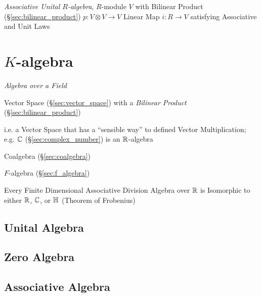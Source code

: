 \emph{Associative Unital $R$-algebra}, $R$-module $V$ with Bilinear
Product (\S\ref{sec:bilinear_product}) $p : V \otimes V \rightarrow V$
Linear Map $i : R \rightarrow V$ satisfying Associative and Unit Laws



\section{$K$-algebra}\label{sec:k_algebra}

\emph{Algebra over a Field}

Vector Space (\S\ref{sec:vector_space}) with a \emph{Bilinear Product}
(\S\ref{sec:bilinear_product})

i.e. a Vector Space that has a ``sensible way'' to defined Vector
Multiplication; e.g. $\mathbb{C}$ (\S\ref{sec:complex_number}) is an
$\mathbb{R}$-algebra

Coalgebra (\S\ref{sec:coalgebra})

$F$-algebra (\S\ref{sec:f_algebra})

Every Finite Dimensional Associative Division Algebra over $\mathbb{R}$ is
Isomorphic to either $\mathbb{R}$, $\mathbb{C}$, or $\mathbb{H}$ (Theorem of
Frobenius) %



\subsection{Unital Algebra}\label{sec:unital_algebra}

\subsection{Zero Algebra}\label{sec:zero_algebra}

\subsection{Associative Algebra}\label{sec:associative_algebra}


